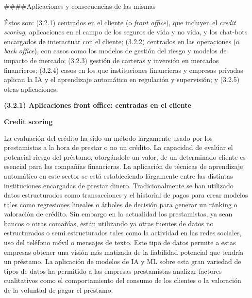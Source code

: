 \documentclass[]{article}
\title{}
\author{}
\date{}
\begin{document}
\#\#\#\#Aplicaciones y consecuencias de las mismas

Éstos son: (3.2.1) centrados en el cliente (o \emph{front office}), que
incluyen el \emph{credit scoring}, aplicaciones en el campo de los
seguros de vida y no vida, y los chat-bots encargados de interactuar con
el cliente; (3.2.2) centrados en las operaciones (o \emph{back office}),
con casos como los modelos de gestión del riesgo y modelos de impacto de
mercado; (3.2.3) gestión de carteras y inversión en mercados
financieros; (3.2.4) casos en los que instituciones financieras y
empresas privadas aplican la IA y el aprendizaje automático en
regulación y supervisión; y (3.2.5) otras aplicaciones.

\textbf{(3.2.1) Aplicaciones front office: centradas en el cliente}

\textbf{Credit scoring}

La evaluación del crédito ha sido un método lárgamente usado por los
prestamistas a la hora de prestar o no un crédito. La capacidad de
evalúar el potencial riesgo del préstamo, otorgándole un valor, de un
determinado cliente es esencial para las compañías financieras. La
aplicación de técnicas de aprendizaje automático en este sector se está
estableciendo lárgamente entre las distintas instituciones encargadas de
prestar dinero. Tradicionalmente se han utilizado datos estructurados
como transacciones y el historial de pagos para crear modelos tales como
regresiones lineales o árboles de decisión para generar un ránking o
valoración de crédito. Sin embargo en la actualidad los prestamistas, ya
sean bancos o otras comañías, están utilizando ya otras fuentes de datos
no estructurados o semi estructurados tales como la actividad en las
redes sociales, uso del teléfono móvil o mensajes de texto. Este tipo de
datos permite a estas empresas obtener una visión más matizada de la
fiabilidad potencial que tendría un préstamo. La aplicación de modelos
de IA y ML sobre esta gran variedad de tipos de datos ha permitido a las
empresas prestamistas analizar factores cualitativos como el
comportamiento del consumo de los clientes o la valoración de la
voluntad de pagar el préstamo.

\setlength\parskip{5ex}
\end{document}
